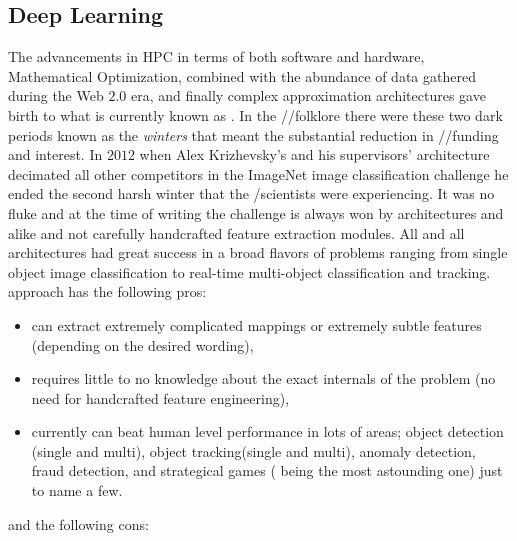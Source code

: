 \subsection{Deep Learning}
The advancements in \ac{HPC}\cite{Meuer} in terms of both software\cite{Dagum1998}\cite{1993}\cite{Nvidia} and 
hardware\cite{Patterson2014}\cite{Hennessy2019}\cite{Nvidia}, Mathematical Optimization\cite{Boyd2004}\cite{Nocedal2006}\cite{Sun2019}, 
\ad\cite{Naumann2011}\cite{Griewank2008} combined with the abundance of data gathered during the Web $2.0$ era, 
and finally complex approximation architectures gave birth to what is currently known as 
\dl\cite{LeCun2015}\cite{Higham2018}\cite{Berner2021}. In the \ml/\dl/\ai folklore there were these two dark 
periods known as the \emph{\ai winters} that meant the substantial reduction in \ml/\dl/\ai funding and 
interest. In $2012$ when Alex Krizhevsky's and his supervisors' \dl architecture \cite{Krizhevsky2017} decimated all other 
competitors in the ImageNet \cite{Deng2009} image classification challenge\cite{SVLL} he ended the second harsh winter 
that the \ml/\ai scientists were experiencing. It was no fluke and at the time of writing the challenge is 
always won by \dl architectures \cite{Szegedy2014}\cite{He2015}\cite{Simonyan2014} and alike and not carefully 
handcrafted feature extraction modules. All and all \dl architectures had great success in a broad flavors of 
problems ranging from single object image classification \cite{Rawat2017} to real-time multi-object classification and 
tracking\cite{Luo2021}. \DL approach has the following pros:

\begin{itemize}
  \item can extract extremely complicated mappings or extremely subtle features (depending on the desired wording),
  \item requires little to no knowledge about the exact internals of the problem (no need for handcrafted feature engineering),
  \item currently can beat human level performance in lots of areas; object detection (single and multi), 
  object tracking(single and multi), anomaly detection, fraud detection, and strategical games (\cite{Silver2016} being the most astounding one) 
  just to name a few.
\end{itemize}

and the following cons:

